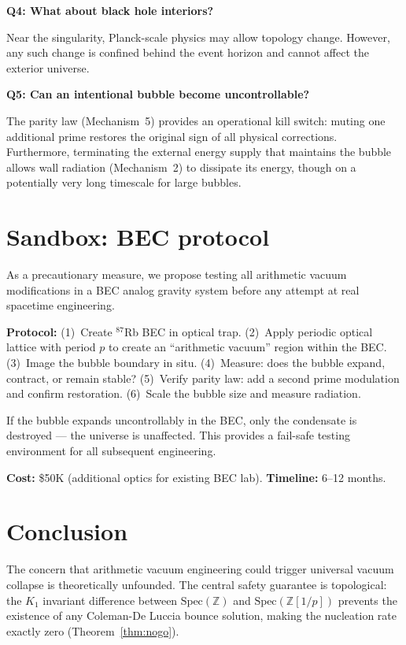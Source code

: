 \documentclass[11pt,a4paper]{article}
\newcommand{\Spec}{\mathrm{Spec}}
\newcommand{\Zp}{\mathbb{Z}[1/p]}
\begin{document}
\textbf{Q4: What about black hole interiors?}

Near the singularity, Planck-scale physics may allow topology
change. However, any such change is confined behind the event
horizon and cannot affect the exterior universe.

\textbf{Q5: Can an intentional bubble become uncontrollable?}

The parity law (Mechanism~5) provides an operational kill switch:
muting one additional prime restores the original sign of all
physical corrections. Furthermore, terminating the external
energy supply that maintains the bubble allows wall radiation
(Mechanism~2) to dissipate its energy, though on a potentially
very long timescale for large bubbles.

\section{Sandbox: BEC protocol}

As a precautionary measure, we propose testing all arithmetic
vacuum modifications in a BEC analog gravity system before
any attempt at real spacetime engineering.

\textbf{Protocol:}
(1)~Create $^{87}$Rb BEC in optical trap.
(2)~Apply periodic optical lattice with period $p$ to create
an ``arithmetic vacuum'' region within the BEC.
(3)~Image the bubble boundary in situ.
(4)~Measure: does the bubble expand, contract, or remain stable?
(5)~Verify parity law: add a second prime modulation and confirm
restoration.
(6)~Scale the bubble size and measure radiation.

If the bubble expands uncontrollably in the BEC, only the
condensate is destroyed --- the universe is unaffected. This
provides a fail-safe testing environment for all subsequent
engineering.

\textbf{Cost:} \$50K (additional optics for existing BEC lab).
\textbf{Timeline:} 6--12 months.

\section{Conclusion}

The concern that arithmetic vacuum engineering could trigger
universal vacuum collapse is theoretically unfounded. The central
safety guarantee is topological: the $K_1$ invariant difference
between $\Spec(\mathbb{Z})$ and $\Spec(\Zp)$ prevents the
existence of any Coleman-De Luccia bounce solution, making the
nucleation rate exactly zero (Theorem~\ref{thm:nogo}).
\end{document}
